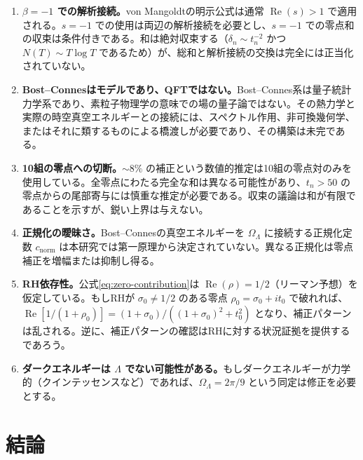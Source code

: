 \documentclass[12pt,a4paper]{article}
\newcommand{\OL}{\Omega_\Lambda}
\begin{document}
\begin{enumerate}[label=(\roman*)]
\item \textbf{$\beta = -1$ での解析接続。}von Mangoldtの明示公式は通常 $\operatorname{Re}(s) > 1$ で適用される。$s = -1$ での使用は両辺の解析接続を必要とし、$s = -1$ での零点和の収束は条件付きである。和は絶対収束する（$\delta_n \sim t_n^{-2}$ かつ $N(T) \sim T\log T$ であるため）が、総和と解析接続の交換は完全には正当化されていない。

\item \textbf{Bost--Connesはモデルであり、QFTではない。}Bost--Connes系は量子統計力学系であり、素粒子物理学の意味での場の量子論ではない。その熱力学と実際の時空真空エネルギーとの接続には、スペクトル作用、非可換幾何学、またはそれに類するものによる橋渡しが必要であり、その構築は未完である。

\item \textbf{10組の零点への切断。}$\sim 8\%$ の補正という数値的推定は10組の零点対のみを使用している。全零点にわたる完全な和は異なる可能性があり、$t_n > 50$ の零点からの尾部寄与には慎重な推定が必要である。収束の議論は和が有限であることを示すが、鋭い上界は与えない。

\item \textbf{正規化の曖昧さ。}Bost--Connesの真空エネルギーを $\OL$ に接続する正規化定数 $c_{\mathrm{norm}}$ は本研究では第一原理から決定されていない。異なる正規化は零点補正を増幅または抑制し得る。

\item \textbf{RH依存性。}公式\eqref{eq:zero-contribution}は $\operatorname{Re}(\rho) = 1/2$（リーマン予想）を仮定している。もしRHが $\sigma_0 \neq 1/2$ のある零点 $\rho_0 = \sigma_0 + it_0$ で破れれば、$\operatorname{Re}[1/(1+\rho_0)] = (1+\sigma_0)/((1+\sigma_0)^2 + t_0^2)$ となり、補正パターンは乱される。逆に、補正パターンの確認はRHに対する状況証拠を提供するであろう。

\item \textbf{ダークエネルギーは $\Lambda$ でない可能性がある。}もしダークエネルギーが力学的（クインテッセンスなど）であれば、$\OL = 2\pi/9$ という同定は修正を必要とする。
\end{enumerate}

\section{結論}
\label{sec:conclusion}
\end{document}
